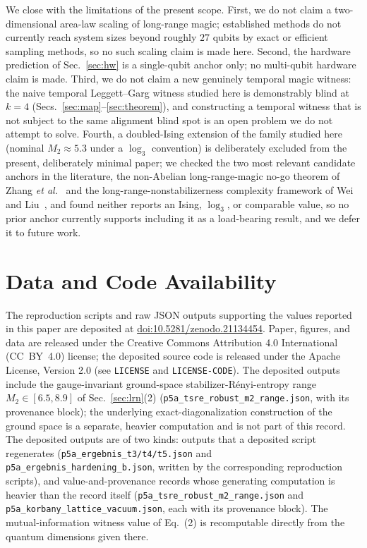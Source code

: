\documentclass[aps,pra,twocolumn,superscriptaddress,longbibliography,floatfix,nofootinbib]{revtex4-2}
\begin{document}
We close with the limitations of the present scope. First, we do not
claim a two-dimensional area-law scaling of long-range magic;
established methods do not currently reach system sizes beyond
roughly $27$ qubits by exact or efficient sampling methods, so no
such scaling claim is made here. Second, the hardware prediction of
Sec.~\ref{sec:hw} is a single-qubit anchor only; no multi-qubit
hardware claim is made. Third, we do not claim a new genuinely
temporal magic witness: the naive temporal Leggett--Garg witness
studied here is demonstrably blind at $k=4$ (Secs.~\ref{sec:map}--\ref{sec:theorem}),
and constructing a temporal witness that is not subject to the same
alignment blind spot is an open problem we do not attempt to solve.
Fourth, a doubled-Ising extension of the family studied here
(nominal $M_2\approx5.3$ under a $\log_3$ convention) is deliberately
excluded from the present, deliberately minimal paper; we checked the
two most relevant candidate anchors in the literature, the
non-Abelian long-range-magic no-go theorem of Zhang \emph{et
al.}~\cite{Zhang2026} and the long-range-nonstabilizerness complexity
framework of Wei and Liu~\cite{WeiLiu2025}, and found neither reports
an Ising, $\log_3$, or comparable value, so no prior anchor currently
supports including it as a load-bearing result, and we defer it to
future work.

\section*{Data and Code Availability}
The reproduction scripts and raw JSON outputs supporting the values
reported in this paper are deposited at
\href{https://doi.org/10.5281/zenodo.21134454}{doi:10.5281/zenodo.21134454}.
Paper, figures, and data are released under the Creative Commons
Attribution 4.0 International (CC~BY~4.0) license; the deposited source
code is released under the Apache License, Version 2.0
(see \texttt{LICENSE} and \texttt{LICENSE-CODE}).
The deposited outputs include the gauge-invariant
ground-space stabilizer-R\'enyi-entropy range $M_2\in[6.5,8.9]$ of
Sec.~\ref{sec:lrn}(2) (\texttt{p5a\_tsre\_robust\_m2\_range.json}, with its
provenance block); the underlying exact-diagonalization construction of
the ground space is a separate, heavier computation and is not part of
this record. The deposited outputs are of two kinds: outputs that a
deposited script regenerates (\texttt{p5a\_ergebnis\_t3/t4/t5.json} and
\texttt{p5a\_ergebnis\_hardening\_b.json}, written by the corresponding
reproduction scripts), and value-and-provenance records whose
generating computation is heavier than the record itself
(\texttt{p5a\_tsre\_robust\_m2\_range.json} and
\texttt{p5a\_korbany\_lattice\_vacuum.json}, each with its provenance
block). The mutual-information witness value of Eq.~(2) is recomputable
directly from the quantum dimensions given there.
\end{document}
